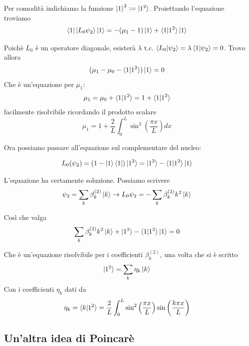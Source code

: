 \documentclass{report}
\begin{document}
{Per comodità indichiamo la funzione $\ket{1}^2 := \ket{1^2}$. Proiettando l'equazione troviamo 
\begin{equation}
    \bra{1}\ket{L_0\psi_2}\ket{1} = -(\mu_1-1)\ket{1} + \braket{1|1^2}\ket{1}
\end{equation}

Poichè $L_0$ è un operatore diagonale, esisterà $\lambda$ t.c. $\braket{L_0|\psi_2} = \lambda \braket{1|\psi_2} = 0$. Trovo allora 
\begin{equation}
    (\mu_1 - \mu_0 - \braket{1|1^2})\ket{1} = 0
\end{equation}
Che è un'equazione per $\mu_1$: 
\begin{equation}
    \mu_1 = \mu_0 + \braket{1|1^2} = 1 + \braket{1|1^2}
\end{equation}
facilmente risolvibile ricordando il prodotto scalare
\begin{equation}
    \mu_1 = 1 + \frac{2}{L}\int_0^{L}\sin^3\left(\frac{\pi x}{L} \right)dx
\end{equation}

Ora possiamo passare all'equazione sul complementare del nucleo: 

\begin{equation}
    L_0(\psi_2) = (1 - \ket{1}\bra{1})\ket{1^2} = \ket{1^2} - \braket{1|1^2}\ket{1}
\end{equation}

L'equazione ha certamente soluzione. Possiamo scrivere 
\begin{equation}
    \psi_2 = \sum_k \beta^{(2)}_k \ket{k} \rightarrow L_0\psi_2 = - \sum_k \beta^{(2)}_k k^2\ket{k}
\end{equation}

Così che valga 
\begin{equation}
    \sum_k \beta^{(2)}_k k^2\ket{k} + \ket{1^2} - \braket{1|1^2}\ket{1} = 0
\end{equation}

Che è un'equazione risolvibile per i coefficienti $\beta^{(2)}_k$, una volta che si è scritto 
\begin{equation}
    \ket{1^2} = \sum_k \eta_k \ket{k}
\end{equation}
Con i coefficienti $\eta_k$ dati da 
\begin{equation}
    \eta_k = \braket{k|1^2} = \frac{2}{L}\int_0^L \sin^2\left(\frac{\pi x}{L} \right)\sin{\left(\frac{k\pi x}{L} \right)}
\end{equation}
}

\subsection{Un'altra idea di Poincarè}
\end{document}
